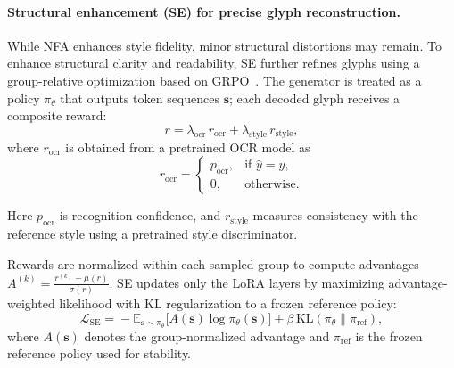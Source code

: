 \paragraph{Structural enhancement (SE) for precise glyph reconstruction.}
While NFA enhances style fidelity, minor structural distortions may remain. To enhance structural clarity and readability, SE further refines glyphs using a group-relative optimization based on GRPO~\cite{DeepseekMath_GRPO}. The generator is treated as a policy $\pi_\theta$ that outputs token sequences $\mathbf{s}$; each decoded glyph receives a composite reward:
\begin{equation}
r=\lambda_{\text{ocr}}\,r_{\text{ocr}}+\lambda_{\text{style}}\,r_{\text{style}},
\end{equation}
\vspace{-1mm}
where $r_{\text{ocr}}$ is obtained from a pretrained OCR model as
\vspace{-2mm}
\begin{equation}
r_{\text{ocr}}=
\begin{cases}
p_{\text{ocr}}, & \text{if } \hat{y}=y,\\[3pt]
0, & \text{otherwise.}
\end{cases}
\end{equation}

Here $p_{\text{ocr}}$ is recognition confidence, and $r_{\text{style}}$ measures consistency with the reference style using a pretrained style discriminator.


Rewards are normalized within each sampled group to compute advantages $A^{(k)} = \frac{r^{(k)} - \mu(r)}{\sigma(r)}$. SE updates only the LoRA layers by maximizing advantage-weighted likelihood with KL regularization to a frozen reference policy:
\vspace{-1mm}
\begin{equation}
\mathcal{L}_{\text{SE}} \!=\! -\mathbb{E}_{\mathbf{s}\sim\pi_\theta}\big[A(\mathbf{s})\log\pi_\theta(\mathbf{s})\big]+\beta\,\mathrm{KL}(\pi_\theta\|\pi_{\text{ref}}),
\end{equation}
where $A(\mathbf{s})$ denotes the group-normalized advantage and $\pi_{\text{ref}}$ is the frozen reference policy used for stability.  

